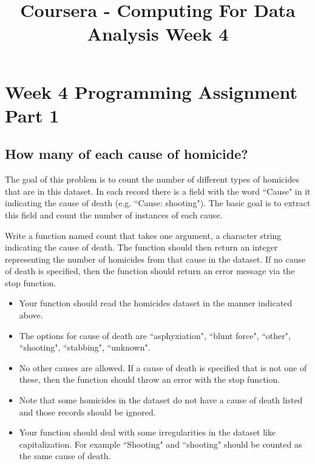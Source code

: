 \documentclass[]{article}
\title{Coursera - Computing For Data Analysis Week 4}
\begin{document}
\maketitle



\section{Week 4 Programming Assignment Part 1}

\subsection{How many of each cause of homicide?}

The goal of this problem is to count the number of different types of homicides that are
in this dataset. In each record there is a field with the word ``Cause" in it indicating the
cause of death (e.g. ``Cause: shooting"). The basic goal is to extract this field and count the
number of instances of each cause.

\bigskip
\noindent
Write a function named count that takes one argument, a character string indicating the
cause of death. The function should then return an integer representing the number of
homicides from that cause in the dataset. If no cause of death is specified, then the function
should return an error message via the stop function.

\begin{itemize}
\item  Your function should read the homicides dataset in the manner indicated above.
\item The options for cause of death are ``asphyxiation", ``blunt force", ``other", ``shooting",
``stabbing", ``unknown". 
\item No other causes are allowed. If a cause of death is specified
that is not one of these, then the function should throw an error with the stop function.
\item Note that some homicides in the dataset do not have a cause of death listed and those
records should be ignored.
\item Your function should deal with some irregularities in the dataset like capitalization.
For example ``Shooting" and ``shooting" should be counted as the same cause of death.
\end{itemize}
\end{document}
